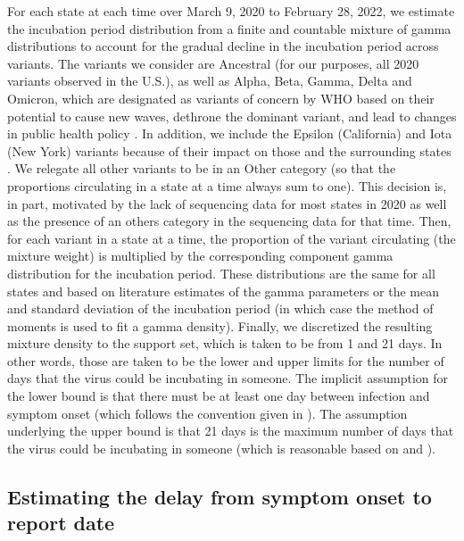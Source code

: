 \documentclass{article}
\begin{document}
For each state at each time over March 9, 2020 to February 28, 2022, we estimate
the incubation period distribution from a finite and countable mixture of gamma
distributions to account for the gradual decline in the incubation period across
variants. The variants we consider are Ancestral (for our purposes, 
all 2020 variants observed in the U.S.), as well as Alpha, Beta, Gamma, Delta and Omicron,
which are designated as variants of concern by WHO based on their potential to
cause new waves, dethrone the dominant variant, and lead to changes in public
health policy \citep{who2021tracking}. In addition, we include the Epsilon
(California) and Iota (New York) variants because of their impact on those and
the surrounding states \citep{yang2022investigation, duerr2021dominance}. We
relegate all other variants to be in an Other category (so that the proportions
circulating in a state at a time always sum to one). This decision is, in part,
motivated by the lack of sequencing data for most states in 2020 as well as the
presence of an others category in the sequencing data for that time. 
Then, for each variant in a state at a time, the proportion of the variant
circulating (the mixture weight) is multiplied by the corresponding component
gamma distribution for the incubation period. These distributions are the same
for all states and based on literature estimates of the gamma parameters or the
mean and standard deviation of the incubation period (in which case the method
of moments is used to fit a gamma density). Finally, we discretized the
resulting mixture density to the support set, which is taken to be from 1 and
21 days. In other words, those are taken to be the lower and upper limits for
the number of days that the virus could be incubating in someone. The implicit
assumption for the lower bound is that there must be at least one day between
infection and symptom onset (which follows the convention given in
\citealp{phcan2021covid}). The assumption underlying the upper bound is that 21
days is the maximum number of days that the virus could be incubating in someone
(which is reasonable based on \citealp{zaki2021estimations} and
\citealp{cortes2022sars}).

\subsection{Estimating the delay from symptom onset to report date} 
\end{document}
